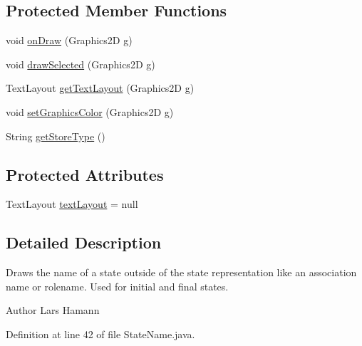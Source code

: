 \subsection*{Protected Member Functions}
\begin{DoxyCompactItemize}
\item 
void \hyperlink{classorg_1_1tzi_1_1use_1_1gui_1_1views_1_1diagrams_1_1statemachine_1_1_state_name_a8005547d7a1b77ad92c72549ee6701f6}{on\-Draw} (Graphics2\-D g)
\item 
void \hyperlink{classorg_1_1tzi_1_1use_1_1gui_1_1views_1_1diagrams_1_1statemachine_1_1_state_name_ab2cee53833c9a67f9ec72757caa6c180}{draw\-Selected} (Graphics2\-D g)
\item 
Text\-Layout \hyperlink{classorg_1_1tzi_1_1use_1_1gui_1_1views_1_1diagrams_1_1statemachine_1_1_state_name_a3e3524a7d9e978bdb8a55a127cae50c2}{get\-Text\-Layout} (Graphics2\-D g)
\item 
void \hyperlink{classorg_1_1tzi_1_1use_1_1gui_1_1views_1_1diagrams_1_1statemachine_1_1_state_name_a7a63e4fa108d2262a320ae1858da1346}{set\-Graphics\-Color} (Graphics2\-D g)
\item 
String \hyperlink{classorg_1_1tzi_1_1use_1_1gui_1_1views_1_1diagrams_1_1statemachine_1_1_state_name_a18a545ab95a2cda564ad04acabfcdee6}{get\-Store\-Type} ()
\end{DoxyCompactItemize}
\subsection*{Protected Attributes}
\begin{DoxyCompactItemize}
\item 
Text\-Layout \hyperlink{classorg_1_1tzi_1_1use_1_1gui_1_1views_1_1diagrams_1_1statemachine_1_1_state_name_a03f8658d093629c45bfcdab8ec0f901f}{text\-Layout} = null
\end{DoxyCompactItemize}


\subsection{Detailed Description}
Draws the name of a state outside of the state representation like an association name or rolename. Used for initial and final states. \begin{DoxyAuthor}{Author}
Lars Hamann 
\end{DoxyAuthor}


Definition at line 42 of file State\-Name.\-java.



